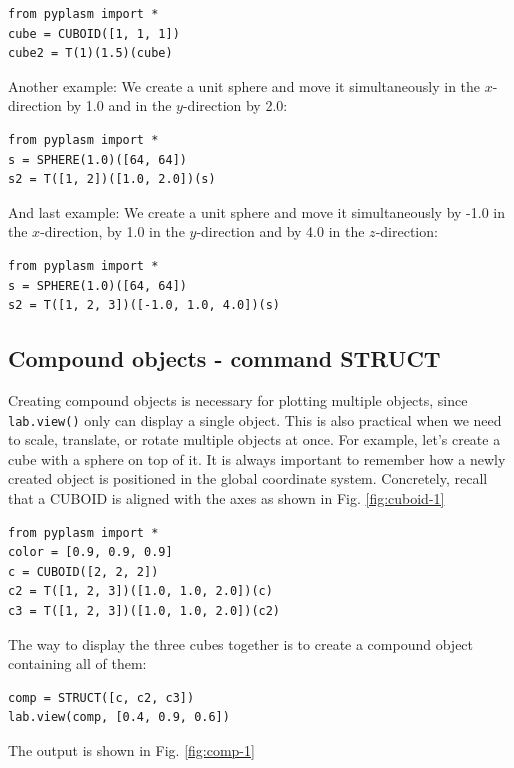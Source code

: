 \documentclass[article,A4,12pt]{llncs}
\begin{document}
\begin{verbatim}
from pyplasm import *
cube = CUBOID([1, 1, 1])
cube2 = T(1)(1.5)(cube)
\end{verbatim}
Another example: We create a unit sphere and move it simultaneously 
in the $x$-direction by 1.0 and in the $y$-direction by 2.0:

\begin{verbatim}
from pyplasm import *
s = SPHERE(1.0)([64, 64])
s2 = T([1, 2])([1.0, 2.0])(s)
\end{verbatim}
And last example: We create a unit sphere and  
move it simultaneously by -1.0 in the $x$-direction, by 1.0 in the $y$-direction
and by 4.0 in the $z$-direction:

\begin{verbatim}
from pyplasm import *
s = SPHERE(1.0)([64, 64])
s2 = T([1, 2, 3])([-1.0, 1.0, 4.0])(s)
\end{verbatim}

\subsection{Compound objects - command STRUCT}

Creating compound objects is necessary
for plotting multiple objects, since {\tt lab.view()} only can 
display a single object. This is also practical 
when we need to scale, translate, or rotate multiple objects at
once. For example, let's create a cube with a sphere on top of it.
It is always important to remember how a newly created
object is positioned in the global coordinate system. Concretely,
recall that 
a CUBOID is aligned with the axes as shown in Fig. \ref{fig:cuboid-1}

\begin{verbatim}
from pyplasm import *
color = [0.9, 0.9, 0.9]
c = CUBOID([2, 2, 2])
c2 = T([1, 2, 3])([1.0, 1.0, 2.0])(c)
c3 = T([1, 2, 3])([1.0, 1.0, 2.0])(c2)
\end{verbatim}
The way to display the three cubes together
is to create a compound object containing all of them:

\begin{verbatim}
comp = STRUCT([c, c2, c3])
lab.view(comp, [0.4, 0.9, 0.6])
\end{verbatim}
The output is shown in Fig. \ref{fig:comp-1}

\newpage
\end{document}
